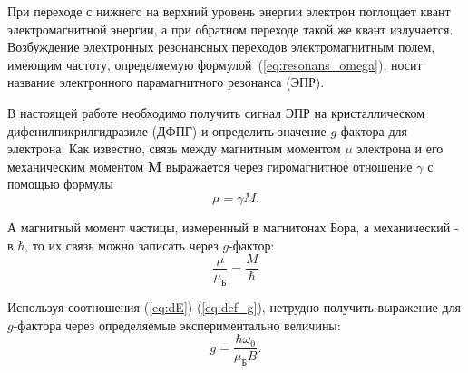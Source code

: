 \documentclass[a4paper, 12pt]{article}
\begin{document}
	При переходе с нижнего на верхний уровень энергии электрон поглощает квант электромагнитной энергии, а при обратном переходе такой же квант излучается. Возбуждение электронных резонансных переходов электромагнитным полем, имеющим частоту, определяемую формулой~(\ref{eq:resonans_omega}), носит название электронного парамагнитного резонанса (ЭПР).
	
	В настоящей работе необходимо получить сигнал ЭПР на кристаллическом дифенилпикрилгидразиле (ДФПГ) и определить значение $g$-фактора для электрона. Как известно, связь между магнитным моментом $\mu$ электрона и его механическим моментом $\mathbf{M}$ выражается через гиромагнитное отношение $\gamma$ с помощью формулы
	\begin{equation}
		\label{eq:gyromagnit}
	    \mu = \gamma M.
	\end{equation}
	
	А магнитный момент частицы, измеренный в магнитонах Бора, а механический - в $\hbar$, то их связь можно записать через $g$-фактор:
	\begin{equation}
	    \label{eq:def_g}
	    \frac{\mu}{\mu_\text{Б}} = \frac{M}{\hbar} 
	\end{equation}

	Используя соотношения (\ref{eq:dE})-(\ref{eq:def_g}), нетрудно получить выражение для $g$-фактора через определяемые экспериментально величины:
	\begin{equation}
		\label{eq:g_is}
		\tag{$\star$}
		g = \frac{\hbar \omega_0}{\mu_\text{Б} B}.
	\end{equation}

\newpage
\end{document}
